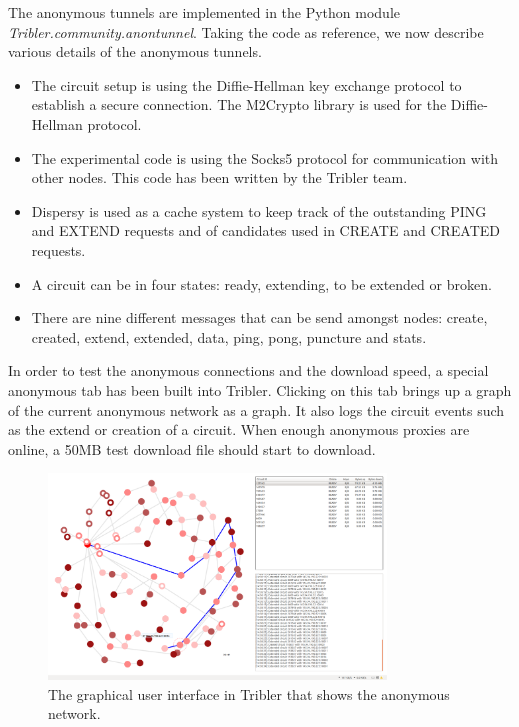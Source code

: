 		The anonymous tunnels are implemented in the Python module \emph{Tribler.community.anontunnel}. Taking the code as reference, we now describe various details of the anonymous tunnels.
		
		\begin{itemize} 
			\item The circuit setup is using the Diffie-Hellman key exchange protocol to establish a secure connection. The M2Crypto library is used for the Diffie-Hellman protocol.
			\item The experimental code is using the Socks5 protocol for communication with other nodes. This code has been written by the Tribler team.
			\item Dispersy is used as a cache system to keep track of the outstanding PING and EXTEND requests and of candidates used in CREATE and CREATED requests.
			\item A circuit can be in four states: ready, extending, to be extended or broken.
			\item There are nine different messages that can be send amongst nodes: create, created, extend, extended, data, ping, pong, puncture and stats.
		\end{itemize}
		
		In order to test the anonymous connections and the download speed, a special anonymous tab has been built into Tribler. Clicking on this tab brings up a graph of the current anonymous network as a graph. It also logs the circuit events such as the extend or creation of a circuit. When enough anonymous proxies are online, a 50MB test download file should start to download.
	
		\begin{figure}[!t]
			\centering
			\includegraphics[width=0.8\textwidth]{prior-work/8hop.png}
			\caption{The graphical user interface in Tribler that shows the anonymous network.}
			\label{fig:anon_downloads}
		\end{figure}